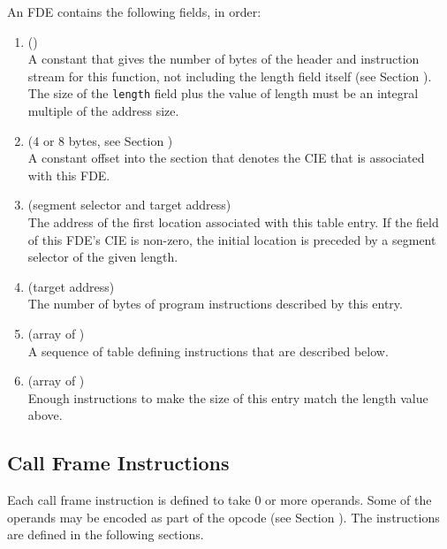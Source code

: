 An FDE contains the following fields, in order:
\begin{enumerate}[1. ]
\item \HFNlength{} ()  \\
A constant that gives the number of bytes of the header and
instruction stream for this function, not including the length
field itself 
(see Section ). 
The size of the \texttt{length} field
plus the value of length must be an integral multiple of the
address size.

\item \HFNCIEpointer{} (4 or 8 bytes, see Section ) \\
A constant 
offset into the \dotdebugframe{}
section that denotes
the CIE that is associated with this FDE.

\item  \HFNinitiallocation{} (segment selector and target address) \\
The address of the first location associated with this table
entry. 
If the \HFNsegmentselectorsize{} field of this FDE's CIE is non-zero,
the initial location is preceded by a segment selector of
the given length.

\item  \HFNaddressrange{} (target address) \\
The number 
of bytes of program instructions described by this entry.

\item \HFNinstructions{} (array of \HFTubyte) \\
A sequence of table defining instructions that are described below.

\item \HFNpadding{} (array of \HFTubyte) \\
Enough \DWCFAnop{} instructions 
to make the size of this entry match the length value above.
\end{enumerate}

\subsection{Call Frame Instructions}
\label{chap:callframeinstructions}

Each call frame instruction is defined to take 0 or more
operands. Some of the operands may be encoded as part of the
opcode 
(see Section ). 
The instructions are defined in
the following sections.

